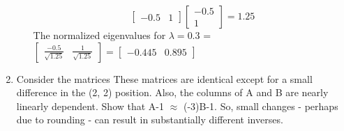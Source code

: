 \documentclass[12pt,a4paper]{paper}
\begin{document}
\begin{enumerate}
\begin{enumerate}
\begin{equation}
\left[\begin{array}{cc}-0.5 &  1\end{array}\right]\left[\begin{array}{c}-0.5 \\  1\end{array}\right] = 1.25
\end{equation}
The normalized eigenvalues for $\lambda = 0.3$ = $\left[\begin{array}{cc}\frac{-0.5}{\sqrt{1.25}} &  \frac{1}{\sqrt{1.25}}\end{array}\right] = \left[\begin{array}{cc}-0.445 & 0.895\end{array}\right]$
\end{enumerate}
\item Consider the matrices
These matrices are identical except for a small difference in the (2, 2) position. Also, the columns of A and B are nearly linearly dependent. Show that A-1 $\approx$ (-3)B-1. So, small changes - perhaps due to rounding - can result in substantially different inverses.
\end{enumerate}
\end{document}
